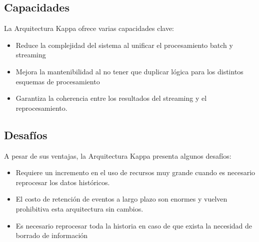 \subsection{Capacidades}
La Arquitectura Kappa ofrece varias capacidades clave:
\begin{itemize}
    \item Reduce la complejidad del sistema al unificar el procesamiento batch y streaming
    \item Mejora la mantenibilidad al no tener que duplicar lógica para los distintos esquemas de procesamiento
    \item Garantiza la coherencia entre los resultados del streaming y el reprocesamiento.
\end{itemize}

\newpage
\subsection{Desafíos}
A pesar de sus ventajas, la Arquitectura Kappa presenta algunos desafíos:
\begin{itemize}
    \item Requiere un incremento en el uso de recursos muy grande cuando es necesario reprocesar los datos históricos.
    \item El costo de retención de eventos a largo plazo son enormes y vuelven prohibitiva esta arquitectura sin cambios.
    \item Es necesario reprocesar toda la historia en caso de que exista la necesidad de borrado de información
\end{itemize}


\newpage